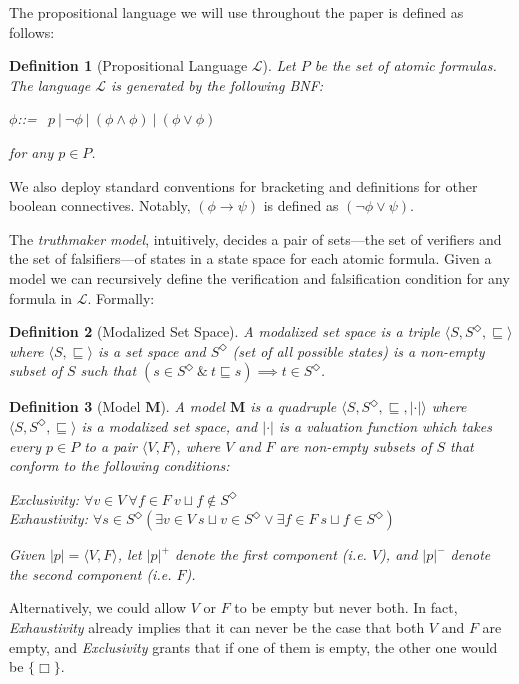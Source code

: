 \documentclass[12pt]{article}
\newtheorem{definition}{Definition}[section]
\begin{document}
The propositional language we will use throughout the paper is defined as follows:
\par
\begin{definition}[Propositional Language $\mathcal{L}$]
    Let $P$ be the set of atomic formulas. The language $\mathcal{L}$ is generated by the following BNF: 
    \par
    {\centering $\phi$::= $\ \ p \  | \ \lnot \phi \ | \ (\phi \land \phi) \ | \ (\phi \lor \phi)$ \par}
    for any $p \in P$.
\end{definition}
We also deploy standard conventions for bracketing and definitions for other boolean connectives. Notably, $(\phi \rightarrow \psi)$ is defined as $(\lnot \phi \lor \psi)$.
\par
The \textit{truthmaker model}, intuitively, decides a pair of sets---the set of verifiers and the set of falsifiers---of states in a state space for each atomic formula. Given a model we can recursively define the verification and falsification condition for any formula in $\mathcal{L}$. Formally:
\begin{definition}[Modalized Set Space]
    A modalized set space is a triple $\langle S, S^\Diamond, \sqsubseteq \rangle$ where $\langle S, \sqsubseteq \rangle$ is a set space and $S^\Diamond$ (set of all possible states) is a non-empty subset of $S$ such that $(s \in S^\Diamond \ \& \ t \sqsubseteq s) \implies t \in S^\Diamond$.
\end{definition}
\begin{definition}[Model $\bm{M}$]
    A model $\bm{M}$ is a quadruple $\langle S, S^\Diamond, \sqsubseteq, | \cdot  | \rangle$ where $\langle S, S^\Diamond, \sqsubseteq \rangle$ is a modalized set space, and $| \cdot |$ is a valuation function which takes every $p \in P$ to a pair $\langle V, F \rangle$, where $V$ and $F$ are non-empty subsets of $S$ that conform to the following conditions: \par
    {\centering
    Exclusivity: $\forall v \! \in \! V \ \forall f \! \in \! F \ v \sqcup f \notin S^\Diamond$ \\
    Exhaustivity: $\forall s \! \in \! S^\Diamond (\exists v \! \in \! V \ s \sqcup v \in S^\Diamond \lor \exists f \! \in \! F \ s \sqcup f \in S^\Diamond)$ \par} 
    Given $|p| = \langle V, F \rangle $, let $|p|^+$ denote the first component (i.e. $V$), and $|p|^-$ denote the second component (i.e. $F$).
\end{definition}
Alternatively, we could allow $V$ or $F$ to be empty but never both. In fact, \textit{Exhaustivity} already implies that it can never be the case that both $V$ and $F$ are empty, and \textit{Exclusivity} grants that if one of them is empty, the other one would be $\{\Box\}$. 
\end{document}
